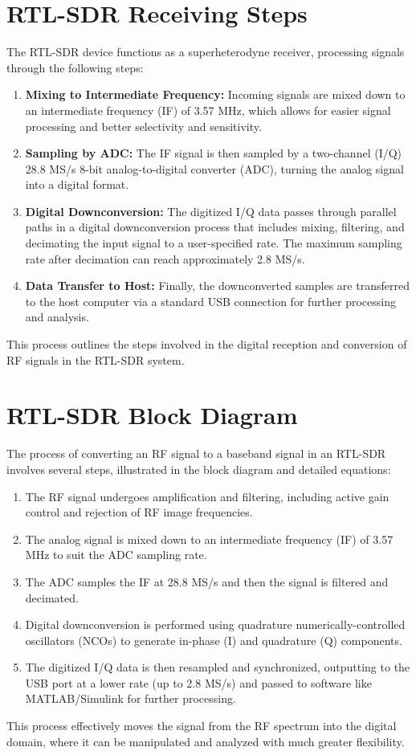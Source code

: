 \section*{RTL-SDR Receiving Steps}

The RTL-SDR device functions as a superheterodyne receiver, processing signals through the following steps:
\begin{enumerate}
    \item \textbf{Mixing to Intermediate Frequency:} Incoming signals are mixed down to an intermediate frequency (IF) of 3.57 MHz, which allows for easier signal processing and better selectivity and sensitivity.
    \item \textbf{Sampling by ADC:} The IF signal is then sampled by a two-channel (I/Q) 28.8 MS/s 8-bit analog-to-digital converter (ADC), turning the analog signal into a digital format.
    \item \textbf{Digital Downconversion:} The digitized I/Q data passes through parallel paths in a digital downconversion process that includes mixing, filtering, and decimating the input signal to a user-specified rate. The maximum sampling rate after decimation can reach approximately 2.8 MS/s.
    \item \textbf{Data Transfer to Host:} Finally, the downconverted samples are transferred to the host computer via a standard USB connection for further processing and analysis.
\end{enumerate}
This process outlines the steps involved in the digital reception and conversion of RF signals in the RTL-SDR system.


\section*{RTL-SDR Block Diagram}
The process of converting an RF signal to a baseband signal in an RTL-SDR involves several steps, illustrated in the block diagram and detailed equations:
\begin{enumerate}
    \item The RF signal undergoes amplification and filtering, including active gain control and rejection of RF image frequencies.
    \item The analog signal is mixed down to an intermediate frequency (IF) of 3.57 MHz to suit the ADC sampling rate.
    \item The ADC samples the IF at 28.8 MS/s and then the signal is filtered and decimated.
    \item Digital downconversion is performed using quadrature numerically-controlled oscillators (NCOs) to generate in-phase (I) and quadrature (Q) components.
    \item The digitized I/Q data is then resampled and synchronized, outputting to the USB port at a lower rate (up to 2.8 MS/s) and passed to software like MATLAB/Simulink for further processing.
\end{enumerate}
This process effectively moves the signal from the RF spectrum into the digital domain, where it can be manipulated and analyzed with much greater flexibility.

